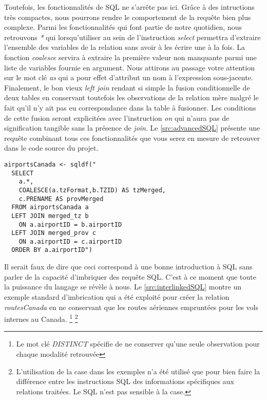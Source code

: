 \noindent
Toutefois, les fonctionnalités de SQL ne s'arrête pas ici. Grâce à des intructions très compactes, nous pourrons rendre le comportement de la requête bien plus complexe. Parmi les fonctionnalités qui font partie de notre quotidien, nous retrouvons \emph{*} qui lorsqu'utiliser au sein de l'instruction \emph{select} permettra d'extraire l'ensemble des variables de la relation sans avoir à les écrire une à la fois. La fonction \emph{coalesce} servira à extraire la première valeur non manquante parmi une liste de variables fournie en argument. Nous attirons au passage votre attention sur le mot clé \emph{as} qui a pour effet d'attribut un nom à l'expression sous-jacente. Finalement, le bon vieux \emph{left join} rendant si simple la fusion conditionnelle de deux tables en conservant toutefois les observations de la relation mère malgré le fait qu'il n'y ait pas eu correspondance dans la table à fusionner. Les conditions de cette fusion seront explicitées avec l'instruction \emph{on} qui n'aura pas de signification tangible sans la présence de \emph{join}. Le \autoref{src:advancedSQL} présente une requête combinant tous ces fonctionnalités que vous serez en mesure de retrouver dans le code source du projet.

\begin{lstlisting}[caption = Fonctionnalités avancées de SQL,label=src:advancedSQL]
airportsCanada <- sqldf("
  SELECT 
    a.*, 
    COALESCE(a.tzFormat,b.TZID) AS tzMerged,
    c.PRENAME AS provMerged
  FROM airportsCanada a 
  LEFT JOIN merged_tz b
  	ON a.airportID = b.airportID
  LEFT JOIN merged_prov c
  	ON a.airportID = c.airportID
  ORDER BY a.airportID")
\end{lstlisting}

\vspace{\baselineskip}
\noindent
Il serait faux de dire que ceci correspond à une bonne introduction à SQL sans parler de la capacité d'imbriquer des requête SQL. C'est à ce moment que toute la puissance du langage se révèle à nous. Le \autoref{src:interlinkedSQL} montre un exemple standard d'imbrication qui a été exploité pour créer la relation \emph{routesCanada} en ne conservant que les routes aériennes empruntées pour les vols internes au Canada. \footnote{Le mot clé \emph{DISTINCT} spécifie de ne conserver qu'une seule observation pour chaque modalité retrouvée} \footnote{L'utilisation de la case dans les exemples n'a été utilisé que pour bien faire la différence entre les instructions SQL des informations spécifiques aux relations traitées. Le SQL n'est pas sensible à la case.}

